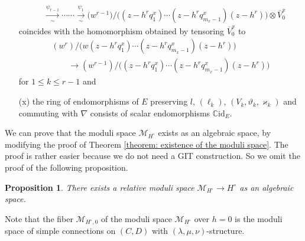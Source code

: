 \documentclass[pdftex]{sigma}
\numberwithin{equation}{section}
\newtheorem{Proposition}[Theorem]{Proposition}
\begin{document}
\begin{itemize}
\begin{gather*}
 \\
 \quad
 \xrightarrow[\sim]{\psi_{r-1}}\cdots\cdots\xrightarrow[\sim]{\psi_1}
 \big(w^{r-1}\big)\big/\big((z-h^rq^x_1)\cdots(z-h^rq^x_{m_x-1})(z-h^r)\big)\otimes \overline{V}^x_0
\end{gather*}
coincides with the homomorphism obtained by tensoring
$\overline{V}^x_0$ to
\begin{gather*}
 (w^r)\big/\big(w(z-h^rq_1^x)\cdots(z-h^rq^x_{m_x-1})(z-h^r)\big)\\
 \qquad{} \rightarrow
 (w^{r-1})\big/\big((z-h^rq^x_1)\cdots(z-h^rq^x_{m_x-1})(z-h^r)\big)
\end{gather*}
for $1\leq k\leq r-1$ and
\item[(x)]
the ring of endomorphisms of $E$ preserving $l$, $(\ell_k)$, $(V_k,\vartheta_k,\varkappa_k)$
and commuting with $\nabla$ consists of scalar endomorphisms
$\mathbb{C}\mathrm{id}_E$.
\end{itemize}

We can prove that the moduli space ${\mathcal M}_{H^{\circ}}$
exists as an algebraic space,
by modifying the proof of Theorem \ref{theorem: existence of the moduli space}.
The proof is rather easier
because we do not need a GIT construction.
So we omit the proof of the following proposition.

\begin{Proposition}
There exists a relative moduli space
${\mathcal M}_{H^{\circ}}\longrightarrow H^{\circ}$
as an algebraic space.
\end{Proposition}

Note that the fiber
${\mathcal M}_{H^{\circ},0}$
of the moduli space ${\mathcal M}_{H^{\circ}}$ over $h=0$
is the moduli space of simple connections
on $(C,D)$ with $(\lambda,\mu,\nu)$-structure.
\end{document}
